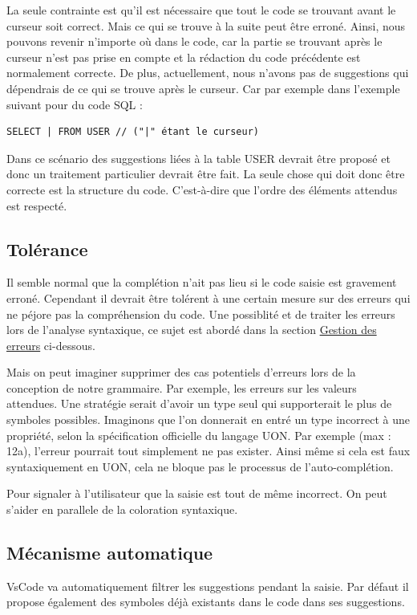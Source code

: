\documentclass[
    iict, %
    il, %
]{heig-tb}
\begin{document}
La seule contrainte est qu'il est nécessaire que tout le code se trouvant avant le curseur soit correct. Mais ce qui se trouve à la suite peut être erroné.
Ainsi, nous pouvons revenir n'importe où dans le code, car la partie se trouvant après le curseur n'est pas prise en compte et la rédaction du code précédente est normalement correcte.
De plus, actuellement, nous n'avons pas de suggestions qui dépendrais de ce qui se trouve après le curseur.
Car par exemple dans l'exemple suivant pour du code SQL :

\begin{lstlisting}
SELECT | FROM USER // ("|" étant le curseur)
\end{lstlisting}

Dans ce scénario des suggestions liées à la table USER devrait être proposé et donc un traitement particulier devrait être fait.
La seule chose qui doit donc être correcte est la structure du code. C'est-à-dire que l'ordre des éléments attendus est respecté.

\subsection{Tolérance}
Il semble normal que la complétion n'ait pas lieu si le code saisie est gravement erroné.
Cependant il devrait être tolérent à une certain mesure sur des erreurs qui ne péjore pas la compréhension du code.
Une possiblité et de traiter les erreurs lors de l'analyse syntaxique, ce sujet est abordé dans la section \hyperref[error handle]{Gestion des erreurs} ci-dessous.

Mais on peut imaginer supprimer des cas potentiels d'erreurs lors de la conception de notre grammaire.
Par exemple, les erreurs sur les valeurs attendues. Une stratégie serait d'avoir un type seul qui supporterait le plus de symboles possibles.
Imaginons que l'on donnerait en entré un type incorrect à une propriété, selon la spécification officielle du langage UON.
Par exemple (max : 12a), l'erreur pourrait tout simplement ne pas exister.
Ainsi même si cela est faux syntaxiquement en UON, cela ne bloque pas le processus de l'auto-complétion.

Pour signaler à l'utilisateur que la saisie est tout de même incorrect. On peut s'aider en parallele de la coloration syntaxique.

\subsection{Mécanisme automatique}
VsCode va automatiquement filtrer les suggestions pendant la saisie.
Par défaut il propose également des symboles déjà existants dans le code dans ses suggestions.
\end{document}
